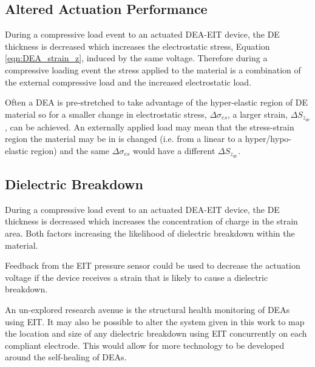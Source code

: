 

\subsection{Altered Actuation Performance}
During a compressive load event to an actuated DEA-EIT device, the DE thickness is decreased which increases the electrostatic stress, Equation \ref{eqn:DEA_strain_z}, induced by the same voltage. Therefore during a compressive loading event the stress applied to the material is a combination of the external compressive load and the increased electrostatic load. 

Often a DEA is pre-stretched to take advantage of the hyper-elastic region of DE material so for a smaller change in electrostatic stress, $\Delta\sigma_{es}$, a larger strain, $\Delta S_{z_{de}}$, can be achieved. An externally applied load may mean that the stress-strain region the material may be in is changed (i.e. from a linear to a hyper/hypo-elastic region) and the same $\Delta\sigma_{es}$ would have a different $\Delta S_{z_{de}}$.

\subsection{Dielectric Breakdown}
During a compressive load event to an actuated DEA-EIT device, the DE thickness is decreased which increases the concentration of charge in the strain area. Both factors increasing the likelihood of dielectric breakdown within the material.

Feedback from the EIT pressure sensor could be used to decrease the actuation voltage if the device receives a strain that is likely to cause a dielectric breakdown.

An un-explored research avenue is the structural health monitoring of DEAs using EIT. It may also be possible to alter the system given in this work to map the location and size of any dielectric breakdown using EIT concurrently on each compliant electrode. This would allow for more technology to be developed around the self-healing of DEAs.



